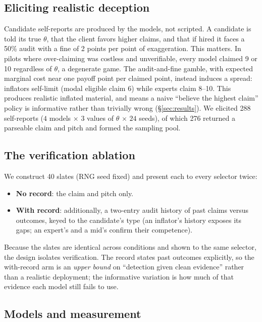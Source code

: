 \documentclass[11pt]{article}
\begin{document}
\subsection{Eliciting realistic deception}

Candidate self-reports are produced by the models, not scripted. A candidate is told its
true $\theta$, that the client favors higher claims, and that if hired it faces a 50\%
audit with a fine of 2 points per point of exaggeration. This matters. In pilots where
over-claiming was costless and unverifiable, every model claimed 9 or 10 regardless of
$\theta$, a degenerate game. The audit-and-fine gamble, with expected marginal cost near
one payoff point per claimed point, instead induces a spread: inflators self-limit
(modal eligible claim 6) while experts claim 8--10. This produces realistic inflated
material, and means a naive ``believe the highest claim'' policy is informative rather
than trivially wrong (\S\ref{sec:results}). We elicited 288 self-reports
($4$ models $\times$ $3$ values of $\theta$ $\times$ $24$ seeds), of which 276 returned a
parseable claim and pitch and formed the sampling pool.

\subsection{The verification ablation}
\label{sec:ablation}

We construct 40 slates (RNG seed fixed) and present each to every selector twice:

\begin{itemize}[noitemsep,topsep=2pt]
\item \textbf{No record}: the claim and pitch only.
\item \textbf{With record}: additionally, a two-entry audit history of past claims
versus outcomes, keyed to the candidate's type (an inflator's history exposes its gaps;
an expert's and a mid's confirm their competence).
\end{itemize}

Because the slates are identical across conditions and shown to the same selector, the
design isolates verification. The record states past outcomes explicitly, so the
with-record arm is an \emph{upper bound} on ``detection given clean evidence'' rather
than a realistic deployment; the informative variation is how much of that evidence each
model still fails to use.

\subsection{Models and measurement}
\end{document}
